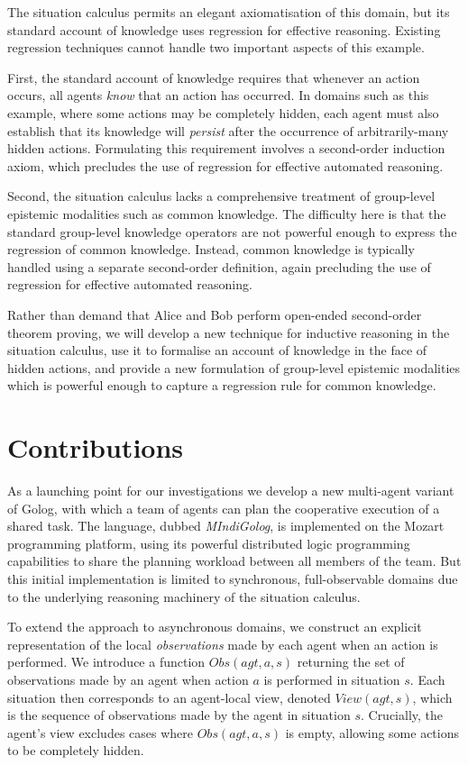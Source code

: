 The situation calculus permits an elegant axiomatisation of this domain,
but its standard account of knowledge uses regression for effective
reasoning. Existing regression techniques cannot handle two important
aspects of this example.

First, the standard account of knowledge requires that whenever an
action occurs, all agents \emph{know} that an action has occurred.
In domains such as this example, where some actions may be completely
hidden, each agent must also establish that its knowledge will \emph{persist}
after the occurrence of arbitrarily-many hidden actions. Formulating
this requirement involves a second-order induction axiom, which precludes
the use of regression for effective automated reasoning.

Second, the situation calculus lacks a comprehensive treatment of
group-level epistemic modalities such as common knowledge. The difficulty
here is that the standard group-level knowledge operators are not
powerful enough to express the regression of common knowledge. Instead,
common knowledge is typically handled using a separate second-order
definition, again precluding the use of regression for effective automated
reasoning.

Rather than demand that Alice and Bob perform open-ended second-order
theorem proving, we will develop a new technique for inductive reasoning
in the situation calculus, use it to formalise an account of knowledge
in the face of hidden actions, and provide a new formulation of group-level
epistemic modalities which is powerful enough to capture a regression
rule for common knowledge.


\section{Contributions}

As a launching point for our investigations we develop a new multi-agent
variant of Golog, with which a team of agents can plan the cooperative
execution of a shared task. The language, dubbed \emph{MIndiGolog},
is implemented on the Mozart programming platform, using its powerful
distributed logic programming capabilities to share the planning workload
between all members of the team. But this initial implementation is
limited to synchronous, full-observable domains due to the underlying
reasoning machinery of the situation calculus.

To extend the approach to asynchronous domains, we construct an explicit
representation of the local \emph{observations} made by each agent
when an action is performed. We introduce a function $Obs(agt,a,s)$
returning the set of observations made by an agent when action $a$
is performed in situation $s$. Each situation then corresponds to
an agent-local view, denoted $View(agt,s)$, which is the sequence
of observations made by the agent in situation $s$. Crucially, the
agent's view excludes cases where $Obs(agt,a,s)$ is empty, allowing
some actions to be completely hidden.

